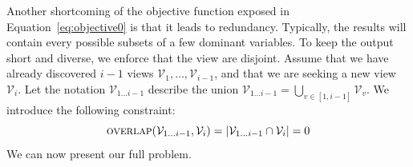 %
Another shortcoming of the objective function exposed in
Equation~\ref{eq:objective0} is that it leads to redundancy.  Typically, the
results will contain every possible subsets of a few dominant variables. To
keep the output short and diverse, we enforce that the view are disjoint.
Assume that we have already discovered $i-1$ views $\mathcal{V}_1, \ldots,
\mathcal{V}_{i-1}$, and that we are seeking a new view $\mathcal{V}_i$. Let the
notation $\mathcal{V}_{1 \ldots i-1}$ describe the union
$\mathcal{V}_{1 \ldots i-1} = \bigcup_{v \in [1,i-1]} \mathcal{V}_v$.  We
introduce the following constraint:
\begin{equation}
    \textsc{overlap}(\mathcal{V}_{1\ldots i-1},\mathcal{V}_i) = 
        \left| \mathcal{V}_{1\ldots i-1} \cap  \mathcal{V}_i \right| = 0
\end{equation}
We can now present our full problem. 

